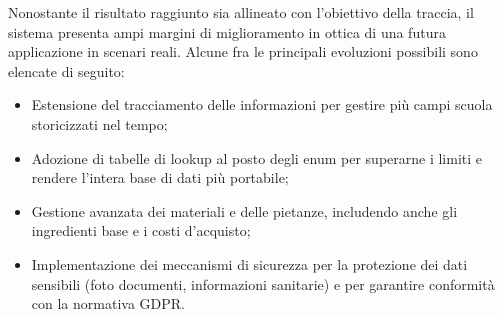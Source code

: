 \documentclass[11pt,a4paper]{article}
\begin{document}
Nonostante il risultato raggiunto sia allineato con l'obiettivo della traccia, il sistema
presenta ampi margini di miglioramento in ottica di una futura applicazione in scenari reali.
Alcune fra le principali evoluzioni possibili sono elencate di seguito:

\begin{itemize}[nosep]
  \item Estensione del tracciamento delle informazioni per gestire più campi scuola
    storicizzati nel tempo;
  \item Adozione di tabelle di lookup al posto degli enum per superarne i limiti e rendere
    l'intera base di dati più portabile;
  \item Gestione avanzata dei materiali e delle pietanze, includendo anche gli ingredienti base
    e i costi d'acquisto;
  \item Implementazione dei meccanismi di sicurezza per la protezione dei dati sensibili (foto
    documenti, informazioni sanitarie) e per garantire conformità con la normativa GDPR.
\end{itemize}
\end{document}
